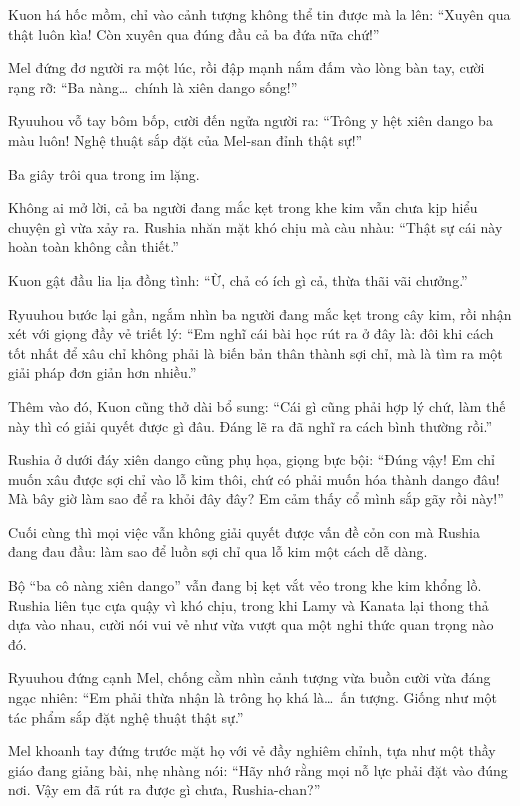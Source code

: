 \documentclass[../main.tex]{subfiles}
\begin{document}
Kuon há hốc mồm, chỉ vào cảnh tượng không thể tin được mà la lên: ``Xuyên qua thật luôn kìa! Còn xuyên qua đúng đầu cả ba đứa nữa chứ!''

Mel đứng đơ người ra một lúc, rồi đập mạnh nắm đấm vào lòng bàn tay, cười rạng rỡ: ``Ba nàng\dots\ chính là xiên dango sống!''

Ryuuhou vỗ tay bôm bốp, cười đến ngửa người ra: ``Trông y hệt xiên dango ba màu luôn! Nghệ thuật sắp đặt của Mel-san đỉnh thật sự!''

Ba giây trôi qua trong im lặng.

Không ai mở lời, cả ba người đang mắc kẹt trong khe kim vẫn chưa kịp hiểu chuyện gì vừa xảy ra. Rushia nhăn mặt khó chịu mà càu nhàu: ``Thật sự cái này hoàn toàn không cần thiết.''

Kuon gật đầu lia lịa đồng tình: ``Ừ, chả có ích gì cả, thừa thãi vãi chưởng.''

Ryuuhou bước lại gần, ngắm nhìn ba người đang mắc kẹt trong cây kim, rồi nhận xét với giọng đầy vẻ triết lý: ``Em nghĩ cái bài học rút ra ở đây là: đôi khi cách tốt nhất để xâu chỉ không phải là biến bản thân thành sợi chỉ, mà là tìm ra một giải pháp đơn giản hơn nhiều.''

Thêm vào đó, Kuon cũng thở dài bổ sung: ``Cái gì cũng phải hợp lý chứ, làm thế này thì có giải quyết được gì đâu. Đáng lẽ ra đã nghĩ ra cách bình thường rồi.''

Rushia ở dưới đáy xiên dango cũng phụ họa, giọng bực bội: ``Đúng vậy! Em chỉ muốn xâu được sợi chỉ vào lỗ kim thôi, chứ có phải muốn hóa thành dango đâu! Mà bây giờ làm sao để ra khỏi đây đây? Em cảm thấy cổ mình sắp gãy rồi này!''

Cuối cùng thì mọi việc vẫn không giải quyết được vấn đề cỏn con mà Rushia đang đau đầu: làm sao để luồn sợi chỉ qua lỗ kim một cách dễ dàng.

\omk

Bộ ``ba cô nàng xiên dango'' vẫn đang bị kẹt vắt vẻo trong khe kim khổng lồ. Rushia liên tục cựa quậy vì khó chịu, trong khi Lamy và Kanata lại thong thả dựa vào nhau, cười nói vui vẻ như vừa vượt qua một nghi thức quan trọng nào đó.

Ryuuhou đứng cạnh Mel, chống cằm nhìn cảnh tượng vừa buồn cười vừa đáng ngạc nhiên: ``Em phải thừa nhận là trông họ khá là\dots\ ấn tượng. Giống như một tác phẩm sắp đặt nghệ thuật thật sự.''

Mel khoanh tay đứng trước mặt họ với vẻ đầy nghiêm chỉnh, tựa như một thầy giáo đang giảng bài, nhẹ nhàng nói: ``Hãy nhớ rằng mọi nỗ lực phải đặt vào đúng nơi. Vậy em đã rút ra được gì chưa, Rushia-chan?''
\end{document}
